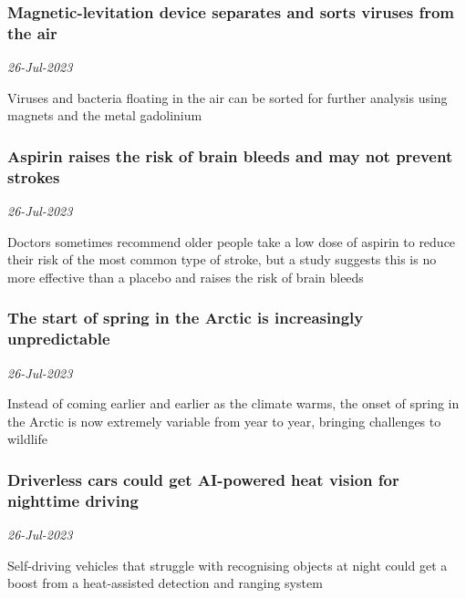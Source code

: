 \subsubsection{Magnetic-levitation device separates and sorts viruses from the air \href{https://www.newscientist.com/article/2384112-magnetic-levitation-device-separates-and-sorts-viruses-from-the-air/?utm_campaign=RSS%7CNSNS&utm_source=NSNS&utm_medium=RSS&utm_content=home}{}}
\textit{26-Jul-2023}

Viruses and bacteria floating in the air can be sorted for further analysis using magnets and the metal gadolinium
\subsubsection{Aspirin raises the risk of brain bleeds and may not prevent strokes \href{https://www.newscientist.com/article/2384633-aspirin-raises-the-risk-of-brain-bleeds-and-may-not-prevent-strokes/?utm_campaign=RSS%7CNSNS&utm_source=NSNS&utm_medium=RSS&utm_content=home}{\ding{225}}}
\textit{26-Jul-2023}

Doctors sometimes recommend older people take a low dose of aspirin to reduce their risk of the most common type of stroke, but a study suggests this is no more effective than a placebo and raises the risk of brain bleeds
\subsubsection{The start of spring in the Arctic is increasingly unpredictable \href{https://www.newscientist.com/article/2384583-the-start-of-spring-in-the-arctic-is-increasingly-unpredictable/?utm_campaign=RSS%7CNSNS&utm_source=NSNS&utm_medium=RSS&utm_content=home}{}}
\textit{26-Jul-2023}

Instead of coming earlier and earlier as the climate warms, the onset of spring in the Arctic is now extremely variable from year to year, bringing challenges to wildlife
\subsubsection{Driverless cars could get AI-powered heat vision for nighttime driving \href{https://www.newscientist.com/article/2384435-driverless-cars-could-get-ai-powered-heat-vision-for-nighttime-driving/?utm_campaign=RSS%7CNSNS&utm_source=NSNS&utm_medium=RSS&utm_content=home}{\ding{225}}}
\textit{26-Jul-2023}

Self-driving vehicles that struggle with recognising objects at night could get a boost from a heat-assisted detection and ranging system
